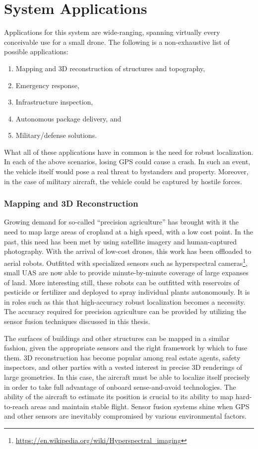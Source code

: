 \section{System Applications}

Applications for this system are wide-ranging, spanning virtually every conceivable use for a small drone. The following is a non-exhaustive list of possible applications:
\begin{enumerate}
    \item Mapping and 3D reconstruction of structures and topography,
    \item Emergency response,
    \item Infrastructure inspection,
    \item Autonomous package delivery, and
    \item Military/defense solutions.
\end{enumerate}
What all of these applications have in common is the need for robust localization. In each of the above scenarios, losing GPS could cause a crash. In such an event, the vehicle itself would pose a real threat to bystanders and property. Moreover, in the case of military aircraft, the vehicle could be captured by hostile forces.

\subsubsection{Mapping and 3D Reconstruction}

Growing demand for so-called ``precision agriculture'' has brought with it the need to map large areas of cropland at a high speed, with a low cost point. In the past, this need has been met by using satellite imagery and human-captured photography. With the arrival of low-cost drones, this work has been offloaded to aerial robots. Outfitted with specialized sensors such as hyperspectral cameras\footnote{\url{https://en.wikipedia.org/wiki/Hyperspectral_imaging}}, small UAS are now able to provide minute-by-minute coverage of large expanses of land. More interesting still, these robots can be outfitted with reservoirs of pesticide or fertilizer and deployed to spray individual plants autonomously. It is in roles such as this that high-accuracy robust localization becomes a necessity. The accuracy required for precision agriculture can be provided by utilizing the sensor fusion techniques discussed in this thesis.

The surfaces of buildings and other structures can be mapped in a similar fashion, given the appropriate sensors and the right framework by which to fuse them. 3D reconstruction has become popular among real estate agents, safety inspectors, and other parties with a vested interest in precise 3D renderings of large geometries. In this case, the aircraft must be able to localize itself precisely in order to take full advantage of onboard sense-and-avoid technologies. The ability of the aircraft to estimate its position is crucial to its ability to map hard-to-reach areas and maintain stable flight. Sensor fusion systems shine when GPS and other sensors are inevitably compromised by various environmental factors.

